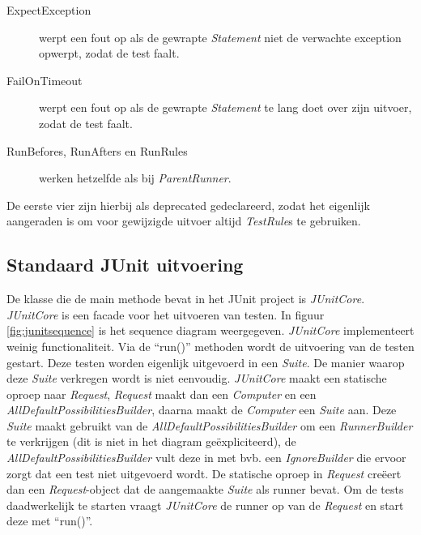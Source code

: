 \documentclass[i1]{oss}
\begin{document}
\begin{description}
\item[ExpectException] werpt een fout op als de gewrapte \emph{Statement} niet de verwachte exception opwerpt, zodat de test faalt.
\item[FailOnTimeout] werpt een fout op als de gewrapte \emph{Statement} te lang doet over zijn uitvoer, zodat de test faalt.
\item[RunBefores, RunAfters en RunRules] werken hetzelfde als bij \emph{ParentRunner}.
\end{description}

De eerste vier zijn hierbij als deprecated gedeclareerd, zodat het eigenlijk aangeraden is om voor gewijzigde uitvoer altijd \emph{TestRule}s te gebruiken.

\subsection{}

\subsection{Standaard JUnit uitvoering}

De klasse die de main methode bevat in het JUnit project is \emph{JUnitCore}.
\emph{JUnitCore} is een facade voor het uitvoeren van testen.
In figuur \ref{fig:junitsequence} is het sequence diagram weergegeven.
\emph{JUnitCore} implementeert weinig functionaliteit.
Via de ``run()'' methoden wordt de uitvoering van de testen gestart.
Deze testen worden eigenlijk uitgevoerd in een \emph{Suite}.
De manier waarop deze \emph{Suite} verkregen wordt is niet eenvoudig.
\emph{JUnitCore} maakt een statische oproep naar \emph{Request},
\emph{Request} maakt dan een \emph{Computer} en een
\emph{AllDefaultPossibilitiesBuilder}, daarna maakt de \emph{Computer}
een \emph{Suite} aan.
Deze \emph{Suite} maakt gebruikt van de \emph{AllDefaultPossibilitiesBuilder}
om een \emph{RunnerBuilder} te verkrijgen (dit is niet in het diagram
ge\"expliciteerd), de \emph{AllDefaultPossibilitiesBuilder} vult deze in met
bvb. een \emph{IgnoreBuilder} die ervoor zorgt dat een test niet uitgevoerd
wordt.
De statische oproep in \emph{Request} cre\"eert dan een \emph{Request}-object
dat de aangemaakte \emph{Suite} als runner bevat.
Om de tests daadwerkelijk te starten vraagt \emph{JUnitCore} de runner op
van de \emph{Request} en start deze met ``run()''.
\end{document}
